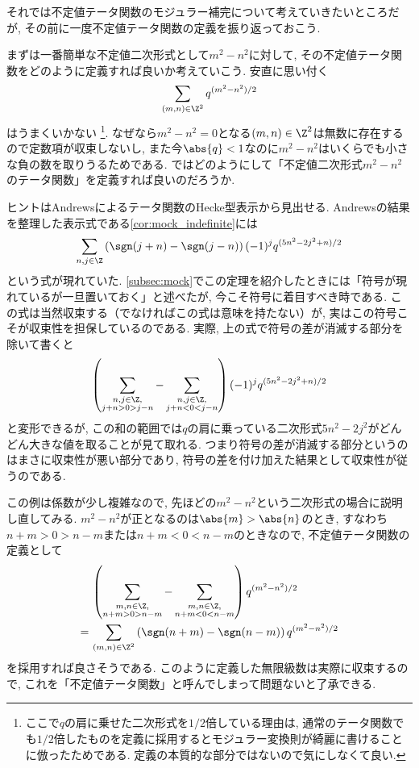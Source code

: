\documentclass[11pt,b5paper,oneside,lualatex]{ltjsarticle} %
\numberwithin{equation}{section} %
\begin{document}

それでは不定値テータ関数のモジュラー補完について考えていきたいところだが, その前に一度不定値テータ関数の定義を振り返っておこう. 

まずは一番簡単な不定値二次形式として$ m^2 - n^2 $に対して, その不定値テータ関数をどのように定義すれば良いか考えていこう. 
安直に思い付く
\[
\sum_{(m, n) \in \Z^2} q^{(m^2 - n^2)/2}
\]
はうまくいかない%
\footnote{ここで$ q $の肩に乗せた二次形式を$ 1/2 $倍している理由は, 通常のテータ関数でも$ 1/2 $倍したものを定義に採用するとモジュラー変換則が綺麗に書けることに倣ったためである. 定義の本質的な部分ではないので気にしなくて良い. }. 
なぜなら$ m^2 - n^2 = 0 $となる$ (m, n) \in \Z^2 $は無数に存在するので定数項が収束しないし, また今$ \abs{q} < 1 $なのに$ m^2 - n^2 $はいくらでも小さな負の数を取りうるためである. 
ではどのようにして「不定値二次形式$ m^2 - n^2 $のテータ関数」を定義すれば良いのだろうか. 

ヒントはAndrewsによるテータ関数のHecke型表示から見出せる. 
Andrewsの結果を整理した表示式である\cref{cor:mock_indefinite}には
\[
\sum_{n, j \in \Z} \left( \sgn(j+n) - \sgn(j-n) \right) (-1)^j q^{(5n^2 - 2j^2 + n)/2}
\]
という式が現れていた. 
\cref{subsec:mock}でこの定理を紹介したときには「符号が現れているが一旦置いておく」と述べたが, 今こそ符号に着目すべき時である. 
この式は当然収束する（でなければこの式は意味を持たない）が, 実はこの符号こそが収束性を担保しているのである. 
実際, 上の式で符号の差が消滅する部分を除いて書くと
\[
\left( \sum_{\substack{n, j \in \Z, \\ j+n > 0 > j-n}} - \sum_{\substack{n, j \in \Z, \\ j+n < 0 < j-n}} \right) (-1)^j q^{(5n^2 - 2j^2 + n)/2}
\]
と変形できるが, この和の範囲では$ q $の肩に乗っている二次形式$ 5n^2 - 2j^2 $がどんどん大きな値を取ることが見て取れる. 
つまり符号の差が消滅する部分というのはまさに収束性が悪い部分であり, 符号の差を付け加えた結果として収束性が従うのである. 

この例は係数が少し複雑なので, 先ほどの$ m^2 - n^2 $という二次形式の場合に説明し直してみる. 
$ m^2 - n^2 $が正となるのは$ \abs{m} > \abs{n} $のとき, すなわち$ n+m > 0 > n-m $または$ n+m < 0 < n-m $のときなので, 不定値テータ関数の定義として
\begin{align}
	&\left( \sum_{\substack{m, n \in \Z, \\ n+m > 0 > n-m}} - \sum_{\substack{m, n \in \Z, \\ n+m < 0 < n-m}} \right) q^{(m^2 - n^2)/2}
	\\
	= \,
	&\sum_{(m, n) \in \Z^2} \left( \sgn(n+m) - \sgn(n-m) \right) q^{(m^2 - n^2)/2}
	\label{eq:indef_ex}
\end{align}
を採用すれば良さそうである. 
このように定義した無限級数は実際に収束するので, これを「不定値テータ関数」と呼んでしまって問題ないと了承できる. 
\end{document}
